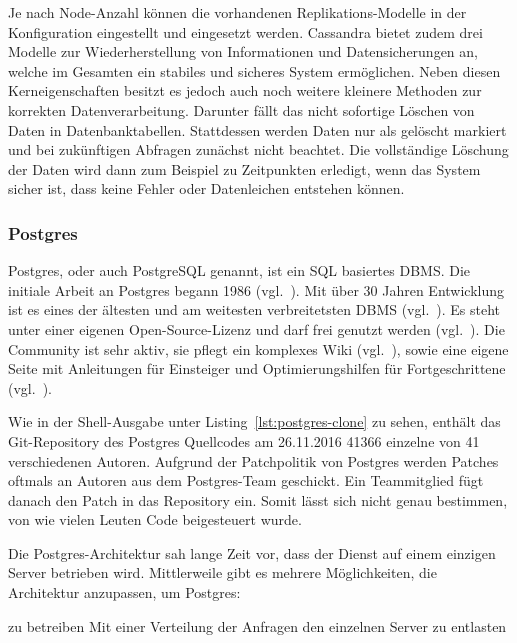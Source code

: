 {Je nach Node\hyp{}Anzahl können die vorhandenen Replikations\hyp{}Modelle in
der Konfiguration eingestellt und eingesetzt werden. Cassandra bietet zudem
drei Modelle zur Wiederherstellung von Informationen und Datensicherungen an,
welche im Gesamten ein stabiles und sicheres System ermöglichen. Neben diesen
Kerneigenschaften besitzt es jedoch auch noch weitere kleinere Methoden zur
korrekten Datenverarbeitung. Darunter fällt das nicht sofortige Löschen von
Daten in Datenbanktabellen. Stattdessen werden Daten nur als gelöscht markiert
und bei zukünftigen Abfragen zunächst nicht beachtet. Die vollständige Löschung
der Daten wird dann zum Beispiel zu Zeitpunkten erledigt, wenn das System
sicher ist, dass keine Fehler oder Datenleichen entstehen können.
\nl%

\subsubsection{Postgres}
\label{subsubsec:postgres}
Postgres, oder auch PostgreSQL genannt, ist ein \gls{SQL} basiertes \gls{DBMS}.
Die initiale Arbeit an Postgres begann 1986 (vgl.~\cite{old_postgres}). Mit
über 30 Jahren Entwicklung ist es eines der ältesten und am weitesten
verbreitetsten DBMS (vgl.~\cite{db_ranking}). Es steht unter einer eigenen
Open\hyp{}Source\hyp{}Lizenz und darf frei genutzt werden
(vgl.~\cite{postgres_license}).  Die Community ist sehr aktiv, sie pflegt ein
komplexes Wiki (vgl.~\cite{postgres_wiki}), sowie eine eigene Seite mit
Anleitungen für Einsteiger und Optimierungshilfen für Fortgeschrittene
(vgl.~\cite{postgres_tutorial}).

Wie in der Shell\hyp{}Ausgabe unter Listing~\ref{lst:postgres-clone} zu sehen,
enthält das \gls{Git}-\gls{Repository} des Postgres Quellcodes am 26.11.2016
41366 einzelne  von 41 verschiedenen Autoren. Aufgrund
der Patchpolitik von Postgres werden Patches oftmals an Autoren aus dem
Postgres\hyp{}Team geschickt. Ein Teammitglied fügt danach den Patch in das
Repository ein. Somit lässt sich nicht genau bestimmen, von wie vielen Leuten
Code beigesteuert wurde.

Die Postgres\hyp{}Architektur sah lange Zeit vor, dass der Dienst auf einem
einzigen Server betrieben wird. Mittlerweile gibt es mehrere Möglichkeiten, die
Architektur anzupassen, um Postgres:

\begin{outline}
  \1  zu betreiben
  \1 
  \1 Mit einer Verteilung der Anfragen den einzelnen Server zu entlasten
\end{outline}

}
